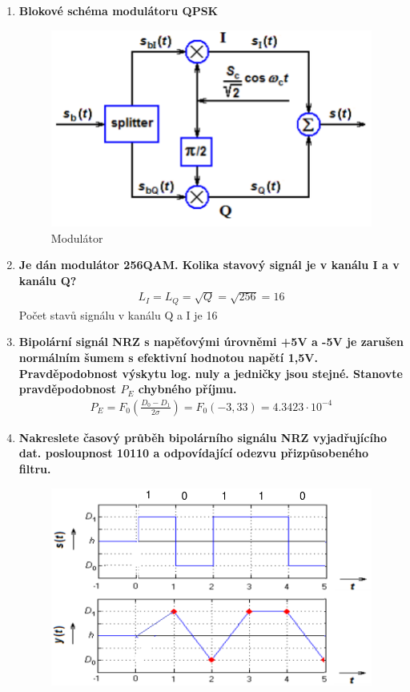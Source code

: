 \begin{enumerate}
    \item \textbf{Blokové schéma modulátoru QPSK}
    \begin{figure}[h]
        \centering
        \includegraphics[scale = 0.5]{images/QPSK.png}
        \caption{Modulátor}
    \end{figure}
    \item \textbf{Je dán modulátor 256QAM. Kolika stavový signál je v kanálu I a v kanálu Q?}\
    \begin{align*}
        L_I = L_Q = \sqrt{Q} = \sqrt{256} = 16
    \end{align*}
    Počet stavů signálu v kanálu Q a I je 16
    \item \textbf{Bipolární signál NRZ s napěťovými úrovněmi +5V a -5V je zarušen normálním šumem s
    efektivní hodnotou napětí 1,5V. Pravděpodobnost výskytu log. nuly a jedničky jsou stejné.
    Stanovte pravděpodobnost \(P_E\) chybného příjmu.}
    \begin{align*}
        P_E = F_0(\frac{D_0 - D_1}{2\sigma}) = F_0(-3,33) = 4.3423\cdot10^{-4}
    \end{align*}
    \item \textbf{Nakreslete časový průběh bipolárního signálu NRZ vyjadřujícího dat. posloupnost 10110 a
    odpovídající odezvu přizpůsobeného filtru.}
    \begin{figure}[h]
        \centering
        \includegraphics[scale = 0.5]{images/NRZfiltr.png}

\end{figure}
\end{enumerate}
